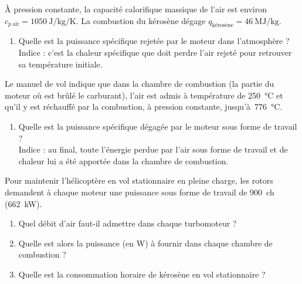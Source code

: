 	À pression constante, la capacité calorifique massique de l’air est environ $c_{p\ \text{air}} = \SI{1050}{\joule\per\kilogram\per\kelvin}$. La combustion du kérosène dégage $q_{\text{kérosène}} = \SI{46}{\mega\joule\per\kilogram}$.

	\begin{enumerate}
		\item Quelle est la puissance spécifique rejetée par le moteur dans l’atmosphère ?\\
			\footnotesize{Indice : c’est la chaleur spécifique que doit perdre l’air rejeté pour retrouver sa température initiale.}
	\end{enumerate}

	Le manuel de vol indique que dans la chambre de combustion (la partie du moteur où est brûlé le carburant), l’air est admis à température de \SI{250}{\degreeCelsius} et qu’il y est réchauffé par la combustion, à pression constante, jusqu’à~\SI{776}{\degreeCelsius}.
	
	\begin{enumerate}
		\item Quelle est la puissance spécifique dégagée par le moteur sous forme de travail ?\\
			\footnotesize{Indice : au final, toute l’énergie perdue par l’air sous forme de travail et de chaleur lui a été apportée dans la chambre de combustion.}
	\end{enumerate}
		
	Pour maintenir l’hélicoptère en vol stationnaire en pleine charge, les rotors demandent à chaque moteur une puissance sous forme de travail de \SI{900}{ch} (\SI{662}{\kilo\watt}).
	
	\begin{enumerate}
		\item Quel débit d’air faut-il admettre dans chaque turbomoteur ?
		\item Quelle est alors la puissance (en \si{\watt}) à fournir dans chaque chambre de combustion ?
		\item Quelle est la consommation horaire de kérosène en vol stationnaire ?
	\end{enumerate}

\exercisesolutionpage
\titreresultats
	\linktosolutionsblurb

